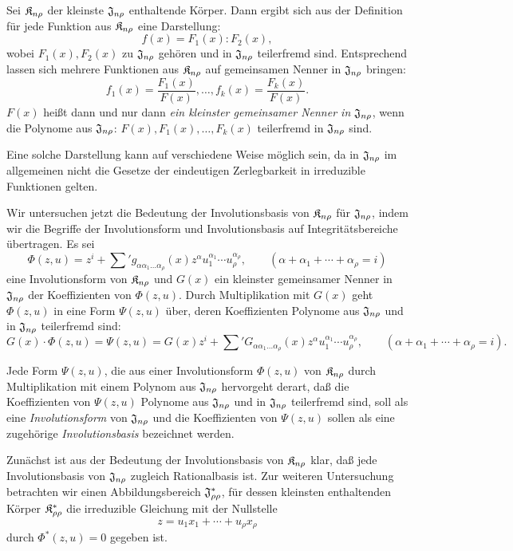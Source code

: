 Sei $\mathfrak{K}_{n\rho}$ der kleinste $\mathfrak{J}_{n\rho}$ enthaltende Körper. Dann ergibt sich aus der Definition für jede Funktion aus $\mathfrak{K}_{n\rho}$ eine Darstellung:
\[
  f(x)=F_1(x):F_2(x),
\]
wobei $F_1(x),F_2(x)$ zu $\mathfrak{J}_{n\rho}$ gehören und in $\mathfrak{J}_{n\rho}$ teilerfremd sind. Entsprechend lassen sich mehrere Funktionen aus $\mathfrak{K}_{n\rho}$ auf gemeinsamen Nenner in $\mathfrak{J}_{n\rho}$ bringen:
\[
  f_1(x)=\frac{F_1(x)}{F(x)},\ldots,
  f_k(x)=\frac{F_k(x)}{F(x)}.
\]
$F(x)$ heißt dann und nur dann \emph{ein kleinster gemeinsamer Nenner in $\mathfrak{J}_{n\rho}$}, wenn die Polynome aus $\mathfrak{J}_{n\rho}$: $F(x),F_1(x),\ldots,F_k(x)$ teilerfremd in $\mathfrak{J}_{n\rho}$ sind.

Eine solche Darstellung kann auf verschiedene Weise möglich sein, da in $\mathfrak{J}_{n\rho}$ im allgemeinen nicht die Gesetze der eindeutigen Zerlegbarkeit in irreduzible Funktionen gelten.

Wir untersuchen jetzt die Bedeutung der Involutionsbasis von $\mathfrak{K}_{n\rho}$ für $\mathfrak{J}_{n\rho}$, indem wir die Begriffe der Involutionsform und Involutionsbasis auf Integritätsbereiche übertragen. Es sei
\[
  \Phi(z,u)=z^i+\sum{}' g_{\alpha\alpha_1\ldots\alpha_\rho}(x)
  z^\alpha u_1^{\alpha_1}\cdots u_\rho^{\alpha_\rho},
  \qquad
  (\alpha+\alpha_1+\cdots+\alpha_\rho=i)
\]
eine Involutionsform von $\mathfrak{K}_{n\rho}$ und $G(x)$ ein kleinster gemeinsamer Nenner in $\mathfrak{J}_{n\rho}$ der Koeffizienten von $\Phi(z,u)$. Durch Multiplikation mit $G(x)$ geht $\Phi(z,u)$ in eine Form $\Psi(z,u)$ über, deren Koeffizienten Polynome aus $\mathfrak{J}_{n\rho}$ und in $\mathfrak{J}_{n\rho}$ teilerfremd sind:
\[
  G(x)\cdot\Phi(z,u)=\Psi(z,u)
  =G(x)z^i+
  \sum{}' G_{\alpha\alpha_1\ldots\alpha_\rho}(x)
  z^\alpha u_1^{\alpha_1}\cdots u_\rho^{\alpha_\rho},
  \qquad
  (\alpha+\alpha_1+\cdots+\alpha_\rho=i).
\]

Jede Form $\Psi(z,u)$, die aus einer Involutionsform $\Phi(z,u)$ von $\mathfrak{K}_{n\rho}$ durch Multiplikation mit einem Polynom aus $\mathfrak{J}_{n\rho}$ hervorgeht derart, daß die Koeffizienten von $\Psi(z,u)$ Polynome aus $\mathfrak{J}_{n\rho}$ und in $\mathfrak{J}_{n\rho}$ teilerfremd sind, soll als eine \emph{Involutionsform} von $\mathfrak{J}_{n\rho}$ und die Koeffizienten von $\Psi(z,u)$ sollen als eine zugehörige \emph{Involutionsbasis} bezeichnet werden.

Zunächst ist aus der Bedeutung der Involutionsbasis von $\mathfrak{K}_{n\rho}$ klar, daß jede Involutionsbasis von $\mathfrak{J}_{n\rho}$ zugleich Rationalbasis ist. Zur weiteren Untersuchung betrachten wir einen Abbildungsbereich $\mathfrak{J}^*_{\rho\rho}$, für dessen kleinsten enthaltenden Körper $\mathfrak{K}^*_{\rho\rho}$ die irreduzible Gleichung mit der Nullstelle
\[
  z=u_1x_1+\cdots+u_\rho x_\rho
\]
durch $\Phi^*(z,u)=0$ gegeben ist.

